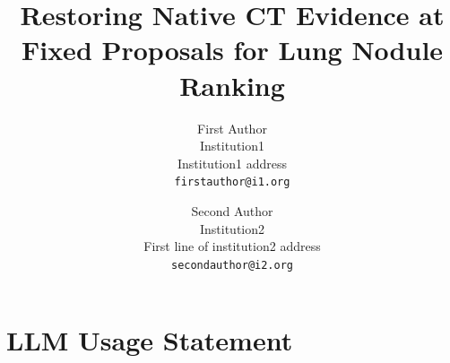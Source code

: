 \documentclass[10pt,twocolumn,letterpaper]{article}
\title{Restoring Native CT Evidence at Fixed Proposals for Lung Nodule Ranking}
\author{First Author\\
Institution1\\
Institution1 address\\
{\tt\small firstauthor@i1.org}
\and
Second Author\\
Institution2\\
First line of institution2 address\\
{\tt\small secondauthor@i2.org}
}
\begin{document}
\maketitle
    




\section*{LLM Usage Statement}

{
    \small
    
    
}

%
\end{document}
